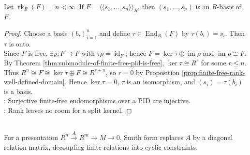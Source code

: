\begin{proposition} \label{prop:spanning-set-size-rank-basis-pid} \\
Let $\operatorname{rk}_R(F)=n<\infty$. If $F=\langle\!\langle s_1,\ldots,s_n\rangle\!\rangle_R$, then $(s_1,\ldots,s_n)$ is an $R$-basis of $F$.
\begin{proof}
Choose a basis $(b_i)_{i=1}^n$ and define $\tau\in\operatorname{End}_R(F)$ by $\tau(b_i)=s_i$. Then $\tau$ is onto.\\
Since $F$ is free, $\exists\rho:F\to F$ with $\tau\rho=\operatorname{id}_F$; hence $F=\ker\tau\oplus\operatorname{im}\rho$ and $\operatorname{im}\rho\cong F$.\\
By Theorem \ref{thm:submodule-of-finite-free-pid-is-free}, $\ker\tau\cong R^r$ for some $r\leq n$. Thus $R^n\cong F\cong\ker\tau\oplus F\cong R^{r+n}$, so $r=0$ by Proposition
\ref{prop:finite-free-rank-well-defined-domain}. Hence $\ker\tau=0$, $\tau$ is an isomorphism, and $(s_i)=\tau(b_i)$ is a basis.\\
: Surjective finite-free endomorphisms over a PID are injective.\\
: Rank leaves no room for a split kernel.
\end{proof}
\end{proposition}

\begin{perspective} \label{per:smith-normal-form-and-module-presentations} \\
For a presentation $R^n\xrightarrow{A}R^m\to M\to0$, Smith form replaces $A$ by a diagonal relation matrix, decoupling finite relations into cyclic constraints.
\end{perspective}

